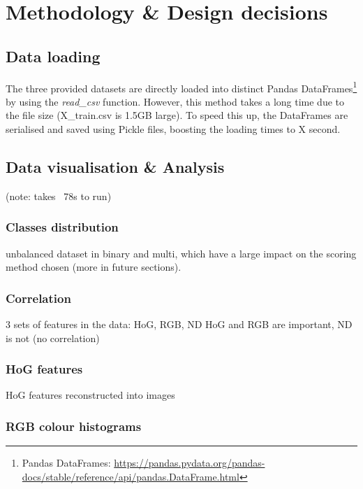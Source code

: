 \documentclass[letterpaper,12pt]{article}
\begin{document}
\section{Methodology \& Design decisions}
\label{sec:methodology-design}

\subsection{Data loading}

The three provided datasets are directly loaded into distinct Pandas DataFrames\footnote{Pandas DataFrames: \url{https://pandas.pydata.org/pandas-docs/stable/reference/api/pandas.DataFrame.html}}  by using the \textit{read\_csv} function. However, this method takes a long time due to the file size (X\_train.csv is 1.5GB large). To speed this up, the DataFrames are serialised and saved using Pickle files, boosting the loading times to X second.

\subsection{Data visualisation \& Analysis}

(note: takes ~78s to run)

\subsubsection{Classes distribution}

unbalanced dataset in binary and multi, which have  a large impact on  the scoring method chosen (more in  future sections).

\subsubsection{Correlation}

3 sets of features in the data: HoG, RGB, ND
HoG and RGB are important, ND is not (no correlation)

\subsubsection{HoG features}

HoG features reconstructed into images

\subsubsection{RGB colour histograms}
\end{document}

